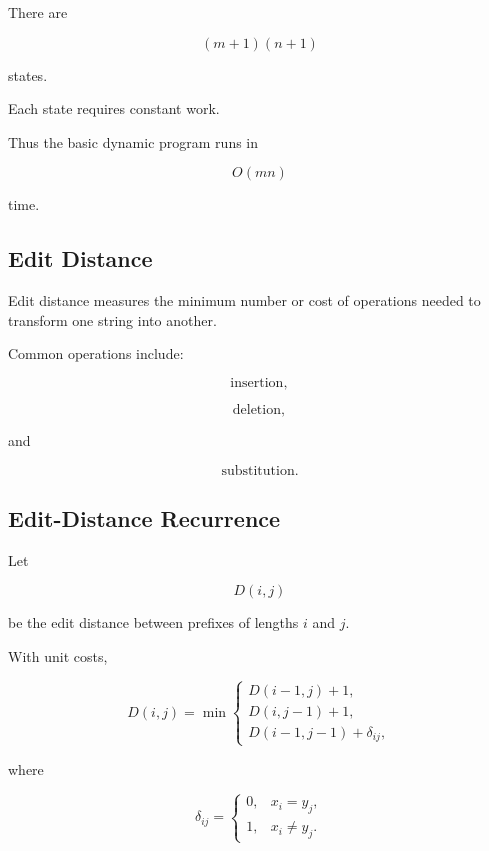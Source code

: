 There are

\[
(m+1)(n+1)
\]

states.

Each state requires constant work.

Thus the basic dynamic program runs in

\[
\boxed{
O(mn)
}
\]

time.

\subsection{Edit Distance}
\label{subsec:edit-distance-dynamic-programming}

Edit distance measures the minimum number or cost of operations needed to
transform one string into another.

Common operations include:

\[
\boxed{
\text{insertion},
}
\]

\[
\boxed{
\text{deletion},
}
\]

and

\[
\boxed{
\text{substitution}.
}
\]

\subsection{Edit-Distance Recurrence}
\label{subsec:edit-distance-recurrence}

Let

\[
D(i,j)
\]

be the edit distance between prefixes of lengths \(i\) and \(j\).

With unit costs,

\[
\boxed{
D(i,j)
=
\min
\begin{cases}
D(i-1,j)+1,\\
D(i,j-1)+1,\\
D(i-1,j-1)+\delta_{ij},
\end{cases}
}
\]

where

\[
\boxed{
\delta_{ij}
=
\begin{cases}
0,
&
x_i=y_j,
\\
1,
&
x_i\neq y_j.
\end{cases}
}
\]

